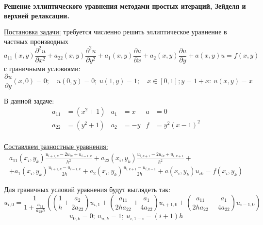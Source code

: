 \documentclass[a4paper,12pt]{report}
\begin{document}
\begin{center}
\Large
{\bf Решение эллиптического уравнения методами простых итераций, Зейделя и верхней релаксации.}
\end{center}

\underline{Постановка задачи:} требуется численно решить эллиптическое уравнение в частных производных
\begin{equation}
a_{11}(x,y)\frac{\partial^2 u}{\partial x^2} + a_{22}(x,y)\frac{\partial^2 u}{\partial y^2} + a_1(x,y)\frac{\partial u}{\partial x} + a_2(x,y)\frac{\partial u}{\partial y} + a(x,y)u = f(x,y)
\end{equation}
с граничными условиями:
\begin{equation}
\frac{\partial u}{\partial y}(x,0) = 0 ; \quad
u(0,y) = 0;\: u(1,y) = 1; \quad
x\in[0,1]; y=1+x:\: u(x,y) = x
\end{equation}

В данной задаче:
\begin{equation}
\begin{aligned}
a_{11} & = (x^2 + 1) & a_1 & = x & a & = 0 \\
a_{22} & = (y^2 + 1) & a_2 & = -y & f & = y^2(x-1)^2 \\
\end{aligned}
\end{equation}

\underline{Составляем разностные уравнения:} 
\begin{multline}
a_{11}(x_i,y_k)\frac{u_{i+1,k}-2u_{ik}+u_{i-1,k}}{h^2} + a_{22}(x_i,y_k)\frac{u_{i,k+1}-2u_{ik}+u_{i,k+1}}{h^2} + \\
+a_1(x_i,y_k)\frac{u_{i+1,k}-u_{i-1,k}}{2h} + a_2(x_i,y_k)\frac{u_{i,k+1}-u_{i,k-1}}{2h} + a(x_i,y_k)u_{ik} = f(x_i,y_k)
\end{multline}

Для граничных условий уравнения будут выглядеть так:
\begin{equation}
u_{i,0}=\frac{1}{1+\frac{a_{11}}{a_{22}h}} \left( \left(\frac{1}{h}+\frac{a_2}{2a_{22}} \right) u_{i,1} + \left(\frac{a_{11}}{2ha_{22}}+\frac{a_1}{4a_{22}} \right) u_{i+1,0} 
+\left(\frac{a_{11}}{2ha_{22}}-\frac{a_1}{4a_{22}} \right) u_{i-1,0} \right)
\end{equation}
\begin{equation}
u_{0,k} = 0; \: u_{n,k} = 1; \: u_{i,1+i} = (i+1)h
\end{equation}
\end{document}
